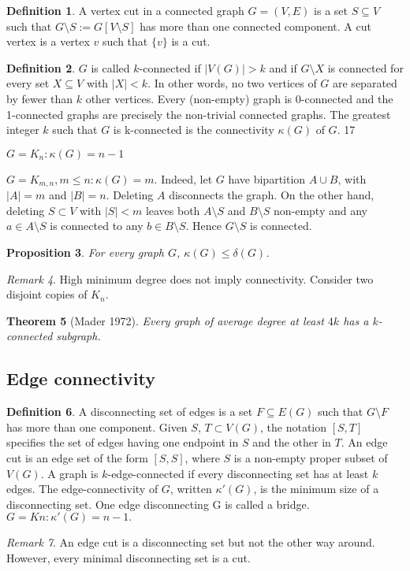 \documentclass[10pt, fleqn, a4paper, landscape]{article}
\theoremstyle{plain} %
\newtheorem{thm}{Theorem}
\newtheorem{pro}[thm]{Proposition}
\theoremstyle{remark} %
\newtheorem{rem}[thm]{Remark}
\theoremstyle{definition} %
\newtheorem{defi}[thm]{Definition}
\begin{document}
\begin{multicols}{3}
\begin{tiny}
\begin{defi}
A vertex cut in a connected graph $G = (V,E)$ is a set $ S \subseteq V$ such that $G\setminus S := G[V \setminus S]$ has more than one connected component. A cut vertex is a vertex $v$ such that $\{v\}$ is a cut.
\end{defi}
\begin{defi}
$G$ is called $k$-connected if $|V (G)|> k$ and if $G\setminus X$ is connected for every set $X \subseteq V$ with $|X|< k$. In other words, no two vertices of $G$ are separated by fewer than $k$ other vertices. Every (non-empty) graph is 0-connected and the 1-connected graphs are precisely the non-trivial connected graphs. The greatest integer $k$ such that $G$ is k-connected is the connectivity $\kappa (G)$ of $G$.
17
\item $G = K_n: \kappa (G) = n - 1$
\item $G = K_{m,n}, m \le n: \kappa (G) = m$. Indeed, let $G$ have bipartition $A \cup B$, with $|A|= m$  and $|B|= n$. Deleting $A$ disconnects the graph. On the other hand, deleting $S \subset V$ with $|S|< m$ leaves both $A\setminus S$ and $B\setminus S$ non-empty and any $a \in A\setminus S$ is connected to any $b \in B \setminus S$. Hence $G\setminus S$ is connected.
\end{defi}
\begin{pro}
For every graph $G$, $\kappa (G) \le \delta(G)$.
\end{pro} 

\begin{rem}
High minimum degree does not imply connectivity. Consider two disjoint copies of $K_n$.
\end{rem}
\begin{thm}[Mader 1972]
Every graph of average degree at least $4k$ has a $k$-connected subgraph.
\end{thm}

\subsection{Edge connectivity}
\begin{defi}
A disconnecting set of edges is a set $F \subseteq E(G)$ such that $G\setminus F$ has more than one component. Given $S$, $T \subset V (G)$, the notation $[S, T]$ specifies the set of edges having one endpoint
in $S$ and the other in $T$. An edge cut is an edge set of the form $[S, S]$, where $S$ is a non-empty proper subset of $V (G)$. A graph is $k$-edge-connected if every disconnecting set has at least $k$ edges.
The edge-connectivity of $G$, written $\kappa'(G)$, is the minimum size of a disconnecting set. One edge disconnecting G is called a bridge.
$G = Kn: \kappa'(G) = n - 1.$
\end{defi}
\addtocounter{thm}{1}
\begin{rem}
An edge cut is a disconnecting set but not the other way around. However, every minimal disconnecting set is a cut.
\end{rem}


\end{tiny}
\end{multicols}
\end{document}
